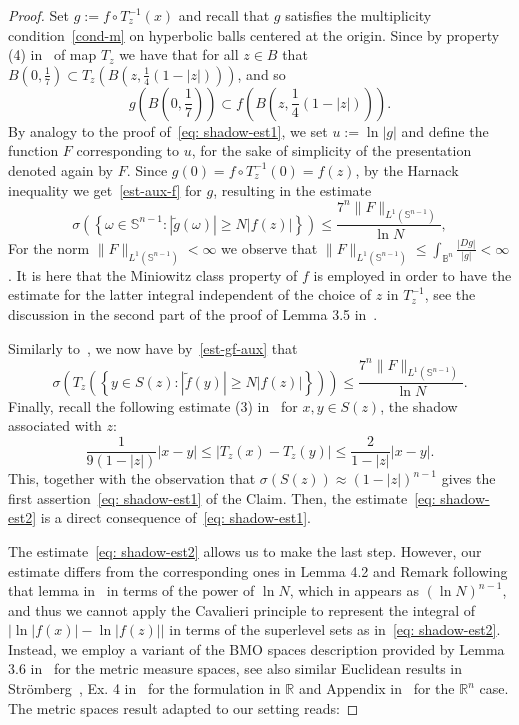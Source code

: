 \documentclass[11pt,a4paper,reqno]{amsart}
\theoremstyle{definition}
\newcommand{\om}{\omega}
\newcommand{\B}{\mathbb{B}^n}
\newcommand{\R}{\mathbb{R}}
\newcommand{\Rn}{{\mathbb R}^n}
\newcommand{\Sn}{\mathbb{S}^{n-1}}
\numberwithin{komcounter}{section}
\begin{document}
\begin{proof}
 Set $g:=f\circ T_z^{-1}(x)$ and recall that $g$ satisfies the multiplicity condition~\eqref{cond-m} on hyperbolic balls centered at the origin. Since by property (4) in~\cite{z} of map $T_z$  we have that for all $z\in B$ that $B(0,\frac17)\subset T_z\left( B(z, \frac14 (1-|z|))\right)$, and so
\[
g( B(0,\frac17) )\subset f \left( B(z, \frac14 (1-|z|))\right).
\]
By analogy to the proof of~\eqref{eq: shadow-est1}, we set $u:=\ln |g|$ and define the function $F$ corresponding to $u$, for the sake of simplicity of the presentation denoted again by $F$. Since $g(0)=f\circ T_z^{-1}(0)=f(z)$, by the Harnack inequality we get~\eqref{est-aux-f} for $g$, resulting in the estimate
\begin{equation}\label{est-gf-aux}
\sigma\left(\left\{\om\in \Sn: |\tilde{g}(\om)|\geq N |f(z)| \right\}\right)\leq \frac{7^n \|F\|_{L^1(\Sn)}}{\ln N},
\end{equation}
For the norm $\|F\|_{L^1(\Sn)}<\infty$ we observe that  $\|F\|_{L^1(\Sn)}\leq \int_{\B}\frac{|Dg|}{|g|}<\infty$. It is here that the Miniowitz class property of $f$ is employed in order to have the estimate for the latter integral independent of the choice of $z$ in $T_z^{-1}$, see the discussion in the second part of the proof of Lemma 3.5 in~\cite{ag2}.

Similarly to~\cite{ag2}, we now have by~\eqref{est-gf-aux} that
\[
\sigma\left(T_z\left(\left\{y \in S(z): |\tilde{f}(y)|\geq N |f(z)| \right\}\right)\right)\leq \frac{7^n \|F\|_{L^1(\Sn)}}{\ln N}.
\]
Finally, recall the following estimate (3) in~\cite{z} for $x,y\in S(z)$, the shadow associated with $z$:
\[
\frac{1}{9(1-|z|)} |x-y|\leq |T_z(x)-T_z(y)|\leq \frac{2}{1-|z|} |x-y|.
\]
 This, together with the observation that $\sigma(S(z)) \approx (1-|z|)^{n-1}$ gives the first assertion~\eqref{eq: shadow-est1} of the Claim. Then, the estimate~\eqref{eq: shadow-est2} is a direct consequence of~\eqref{eq: shadow-est1}.

The estimate~\eqref{eq: shadow-est2} allows us to make the last step. However, our estimate differs from the corresponding ones in Lemma 4.2 and Remark following that lemma in~\cite{ak} in terms of the power of $\ln N$, which in \cite{ak} appears as $(\ln N)^{n-1}$, and thus we cannot apply the Cavalieri principle to represent the integral of $\big|\ln|f(x)|-\ln|f(z)|\big|$ in terms of the superlevel sets as in~\eqref{eq: shadow-est2}. Instead, we employ a variant of the BMO spaces description provided by Lemma 3.6 in~\cite{kkms} for the metric measure spaces, see also similar Euclidean results in Str\"omberg~\cite{str}, Ex. 4 in~\cite[pg.  261, Ch VI]{g} for the formulation in $\R$ and Appendix in~\cite{agg} for the $\Rn$ case. The metric spaces result adapted to our setting reads:


\end{proof}
\end{document}
